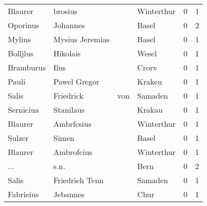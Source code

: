 \begin{center}
\begin{tiny}
\begin{longtabu}{llllrr}
                  Blaurer &                            brosius &             &                                  Winterthur &          0 &         1 \\
                 Oporinus &                           Johannes &             &                                       Basel &          0 &         2 \\
                   Mylius &                    Mysius Jeremias &             &                                       Basel &          0 &         1 \\
                 Bolljlus &                           Hikolais &             &                                       Wesel &          0 &         1 \\
                Bramburus &                               Ilus &             &                                       Crorv &          0 &         1 \\
                    Pauli &                       Pawel Gregor &             &                                      Krakeu &          0 &         1 \\
                    Salis &                          Friedrick &         von &                                     Samaden &          0 &         1 \\
                Serniciua &                          Stanilaus &             &                                      Krakau &          0 &         1 \\
                  Blaurer &                         Ambrfcsius &             &                                  Winterthur &          0 &         1 \\
                   Sulzer &                              Simen &             &                                       Basel &          0 &         1 \\
                  Blaurer &                         Ambrofcius &             &                                  Winterthur &          0 &         1 \\
                      ... &                               s.n. &             &                                        Bern &          0 &         2 \\
                    Salis &                     Friedrieh Tenn &             &                                     Samaden &          0 &         1 \\
                Fabrieius &                           Jebannes &             &                                        Chur &          0 &         1 \\

\end{longtabu}
\end{tiny}
\end{center}
